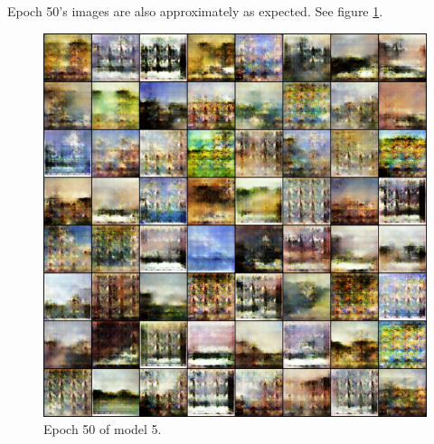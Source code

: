 \documentclass[11pt,letterpaper]{article}
\begin{document}
				Epoch 50's images are also approximately as expected.
				See figure \ref{fig:wa128:epoch050generator}.
				\begin{figure}
					\centering
					\includegraphics[width=1.0\linewidth]{results/model5/epoch050_generator}
					\caption{Epoch 50 of model 5.}
					\label{fig:wa128:epoch050generator}
				\end{figure}
\end{document}
